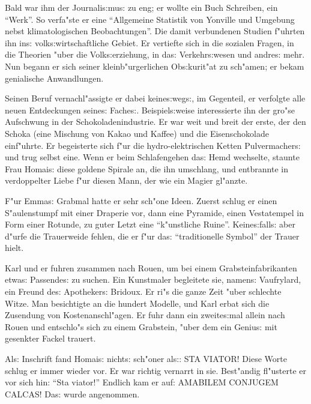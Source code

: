 \documentclass[oneside,12pt]{book}
\newenvironment{antiqua}{\normalfont}{}%
\newcommand{\s}{s:}%
\begin{document}
Bald war ihm der Journali{\s}mu{\s} zu eng; er wollte ein Buch
Schreiben, ein "`Werk"'. So verfa"ste er eine "`Allgemeine
Statistik von Yonville und Umgebung nebst klimatologischen
Beobachtungen"'. Die damit verbundenen Studien f"uhrten ihn in{\s}
volk{\s}wirtschaftliche Gebiet. Er vertiefte sich in die sozialen
Fragen, in die Theorien "uber die Volk{\s}erziehung, in da{\s}
Verkehr{\s}wesen und andre{\s} mehr. Nun begann er sich seiner
kleinb"urgerlichen Ob{\s}kurit"at zu sch"amen; er bekam
genialische Anwandlungen.

Seinen Beruf vernachl"assigte er dabei keine{\s}weg{\s}, im
Gegenteil, er verfolgte alle neuen Entdeckungen seine{\s}
Fache{\s}. Beispiel{\s}weise interessierte ihn der gro"se
Aufschwung in der Schokoladenindustrie. Er war weit und breit der
erste, der den Schoka (eine Mischung von Kakao und Kaffee) und die
Eisenschokolade einf"uhrte. Er begeisterte sich f"ur die
hydro-elektrischen Ketten Pulvermacher{\s} und trug selbst eine.
Wenn er beim Schlafengehen da{\s} Hemd wechselte, staunte Frau
Homai{\s} diese goldene Spirale an, die ihn umschlang, und
entbrannte in verdoppelter Liebe f"ur diesen Mann, der wie ein
Magier gl"anzte.

F"ur Emma{\s} Grabmal hatte er sehr sch"one Ideen. Zuerst schlug
er einen S"aulenstumpf mit einer Draperie vor, dann eine Pyramide,
einen Vestatempel in Form einer Rotunde, zu guter Letzt eine
"`k"unstliche Ruine"'. Keine{\s}fall{\s} aber d"urfe die
Trauerweide fehlen, die er f"ur da{\s} "`traditionelle Symbol"'
der Trauer hielt.

Karl und er fuhren zusammen nach Rouen, um bei einem
Grabsteinfabrikanten etwa{\s} Passende{\s} zu suchen. Ein
Kunstmaler begleitete sie, namen{\s} Vaufrylard, ein Freund de{\s}
Apotheker{\s} Bridoux. Er ri"s die ganze Zeit "uber schlechte
Witze. Man besichtigte an die hundert Modelle, und Karl erbat sich
die Zusendung von Kostenanschl"agen. Er fuhr dann ein
zweite{\s}mal allein nach Rouen und entschlo"s sich zu einem
Grabstein, "uber dem ein Geniu{\s} mit gesenkter Fackel trauert.

Al{\s} Inschrift fand Homai{\s} nicht{\s} sch"oner al{\s}:
\begin{antiqua}STA VIATOR!\end{antiqua} Diese Worte schlug er
immer wieder vor. Er war richtig vernarrt in sie. Best"andig
fl"usterte er vor sich hin: "`\begin{antiqua}Sta
viator!\end{antiqua}"' Endlich kam er auf: \begin{antiqua}AMABILEM
CONJUGEM CALCAS!\end{antiqua} Da{\s} wurde angenommen.
\end{document}

